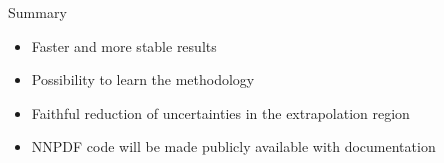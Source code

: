 \documentclass[aspectratio=169,10pt]{beamer}
\begin{document}
\begin{frame}[t]{Summary}
    \begin{itemize}
        \item Faster and more stable results
        \item Possibility to learn the methodology 
        \item Faithful reduction of uncertainties in the extrapolation region
        \vspace*{1em}
        \item NNPDF code will be made publicly available with documentation
    \end{itemize}
    \vspace*{2em}
\end{frame}



\end{document}
